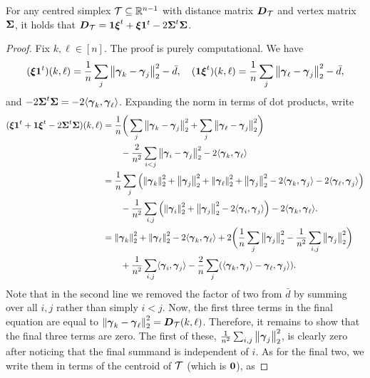 \begin{lemma}
	\label{lem:distance_matrix}
	For any centred simplex $\mathcal{T}\subseteq\mathbb{R}^{n-1}$  with distance matrix $\vb*{D}_{\mathcal{T}}$ and vertex  matrix $\boldsymbol{\Sigma}$, it holds  that $\vb*{D}_{\mathcal{T}} = \vb{1}\vb*{\xi}^t + \vb*{\xi}\vb{1}^t - 2\boldsymbol{\Sigma}^t\boldsymbol{\Sigma}$.
\end{lemma}
\begin{proof}
	Fix  $k,\ell\in[n]$. The proof is purely computational. We have 
	\begin{equation*}
	(\vb*{\xi}\vb{1}^t)(k,\ell) = \frac{1}{n}\sum_j\norm{\vb*{\gamma}_k-\vb*{\gamma}_j}_2^2 - \bar{d},\quad (\vb{1}\vb*{\xi}^t)(k,\ell) = \frac{1}{n}\sum_j\norm{\vb*{\gamma}_\ell-\vb*{\gamma}_j}_2^2 - \bar{d}, 
	\end{equation*}
	and  $-2\boldsymbol{\Sigma}^t\boldsymbol{\Sigma} = -2\langle \vb*{\gamma}_k,\vb*{\gamma}_\ell\rangle$. 
	Expanding the norm in terms of dot products, write
	\begin{align*}
	(\vb*{\xi}\vb{1}^t + \vb{1}\vb*{\xi}^t - 2\boldsymbol{\Sigma}^t\boldsymbol{\Sigma})(k,\ell) &= \frac{1}{n}\bigg(\sum_j \norm{\vb*{\gamma}_k-\vb*{\gamma}_j}_2^2 + \sum_j\norm{\vb*{\gamma}_\ell-\vb*{\gamma}_j}_2^2 \bigg) \\
	&\qquad- \frac{2}{n^2}\sum_{i<j} \norm{\vb*{\gamma}_i-\vb*{\gamma}_j}_2^2 -2\langle\vb*{\gamma}_k,\vb*{\gamma}_\ell\rangle \\ 
	&=\frac{1}{n}\sum_j\left(\norm{\vb*{\gamma}_k}_2^2 + \norm{\vb*{\gamma}_j}_2^2+\norm{\vb*{\gamma}_\ell}_2^2 +\norm{\vb*{\gamma}_j}_2^2  -2\langle \vb*{\gamma}_k,\vb*{\gamma}_j\rangle -2\langle\vb*{\gamma}_\ell,\vb*{\gamma}_j\rangle\right) \\
	&\qquad -\frac{1}{n^2}\sum_{i,j}\left(\norm{\vb*{\gamma}_i}_2^2+\norm{\vb*{\gamma}_j}_2^2-2\langle\vb*{\gamma}_i,\vb*{\gamma}_j\rangle\right)  -2\langle \vb*{\gamma}_k,\vb*{\gamma}_\ell\rangle. \\
	&= \norm{\vb*{\gamma}_k}_2^2 + \norm{\vb*{\gamma}_\ell}_2^2 - 2\langle\vb*{\gamma}_k,\vb*{\gamma}_\ell\rangle + 2\bigg(\frac{1}{n}\sum_j\norm{\vb*{\gamma}_j}_2^2 - \frac{1}{n^2}\sum_{i,j}\norm{\vb*{\gamma}_j}_2^2\bigg)  \\
	&\qquad +\frac{1}{n^2}\sum_{i,j} \langle \vb*{\gamma}_i,\vb*{\gamma}_j\rangle - \frac{2}{n}\sum_j (\langle \vb*{\gamma}_k,\vb*{\gamma}_j\rangle -\vb*{\gamma}_\ell,\vb*{\gamma}_j\rangle).
	\end{align*} 
	Note that in the second  line we removed the factor of two from $\bar{d}$ by summing over all $i,j$ rather than simply $i<j$. 
	Now, the first three terms in the final equation are  equal to $\norm{\vb*{\gamma}_k-\vb*{\gamma}_\ell}_2^2=\vb*{D}_{\mathcal{T}}(k,\ell)$. Therefore,  it remains  to show  that the final  three terms are zero. The first  of  these, $\frac{1}{n^2}\sum_{i,j}\norm{\vb*{\gamma}_j}_2^2$,  is clearly   zero after noticing that the final summand is independent of $i$. As for the final two, we write them in terms of  the centroid of $\mathcal{T}$ (which is $\vb{0}$), as 

\end{proof}
